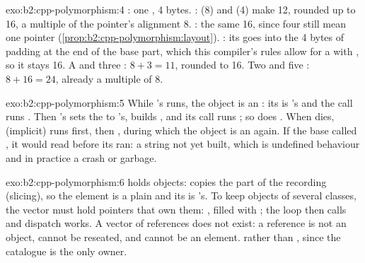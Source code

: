 \begin{solution}{exo:b2:cpp-polymorphism:4}
: one , 4 bytes. :  (8) and  (4) make 12, rounded up to
16, a multiple of the pointer's alignment 8. : the same 16, since four  still mean
one pointer (\cref{prop:b2:cpp-polymorphism:layout}). : its  goes into the 4 bytes of padding
at the end of the base part, which this compiler's rules allow for a  with , so it stays
16. A  and three : $8 + 3 = 11$, rounded to 16. Two  and five :
$8 + 16 = 24$, already a multiple of 8.
\end{solution}

\begin{solution}{exo:b2:cpp-polymorphism:5}
While 's  runs, the object is an : its  is 's and the call
runs . Then 's  sets the  to 's, builds
, and its call runs ; so does . When  dies,  (implicit)
runs first, then , during which the object is an  again. If the base  called
, it would read  before its  ran: a string not yet built, which is
undefined behaviour and in practice a crash or garbage.
\end{solution}

\begin{solution}{exo:b2:cpp-polymorphism:6}
 holds  objects:  copies the  part of the recording
(slicing), so the element is a plain  and its  is 's. To keep objects of several
classes, the vector must hold pointers that own them: , filled with
; the loop then calls  and dispatch works. A vector of
references does not exist: a reference is not an object, cannot be reseated, and cannot be an element.
 rather than , since the catalogue is the only owner.
\end{solution}

